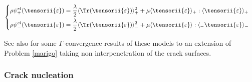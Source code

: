 \begin{itemize}
    \begin{equation}
        \label{spectral_decomposition}
        \begin{cases}
            \begin{aligned}
                & \rho \psi^{el}_{+}(\tensorii{\varepsilon})
                =
                \frac{\lambda}{2} \langle \Tr(\tensorii{\varepsilon}) \rangle_{+}^{2}
                +
                \mu \langle \tensorii{\varepsilon} \rangle_{+} : \langle \tensorii{\varepsilon} \rangle_{+}
                \\
                & \rho \psi^{el}_{-}(\tensorii{\varepsilon})
                =
                \frac{\lambda}{2} \langle \Tr(\tensorii{\varepsilon}) \rangle_{-}^{2}
                +
                \mu \langle \tensorii{\varepsilon} \rangle : \langle_{-} \tensorii{\varepsilon} \rangle_{-}
            \end{aligned}
        \end{cases}
    \end{equation}
\end{itemize}

See also \cite{chambolle_approximation_2018} for some $\Gamma$-convergence
results of these models to an extension of Problem \eqref{marigo}
taking non interpenetration of the crack surfaces.

\subsubsection{Crack nucleation}
\label{crack_nucleation}

